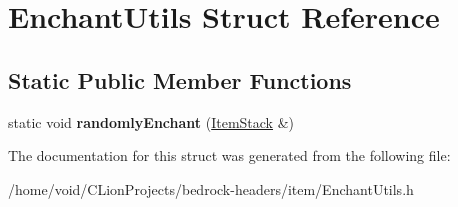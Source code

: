 \hypertarget{struct_enchant_utils}{}\section{Enchant\+Utils Struct Reference}
\label{struct_enchant_utils}
\subsection*{Static Public Member Functions}
\begin{DoxyCompactItemize}
\item 
\mbox{\label{struct_enchant_utils_a3fb91428d5b945e7489bcd49d761c958}} 
static void {\bfseries randomly\+Enchant} (\mbox{\hyperlink{struct_item_stack}{Item\+Stack}} \&)
\end{DoxyCompactItemize}


The documentation for this struct was generated from the following file\+:\begin{DoxyCompactItemize}
\item 
/home/void/\+C\+Lion\+Projects/bedrock-\/headers/item/Enchant\+Utils.\+h\end{DoxyCompactItemize}
